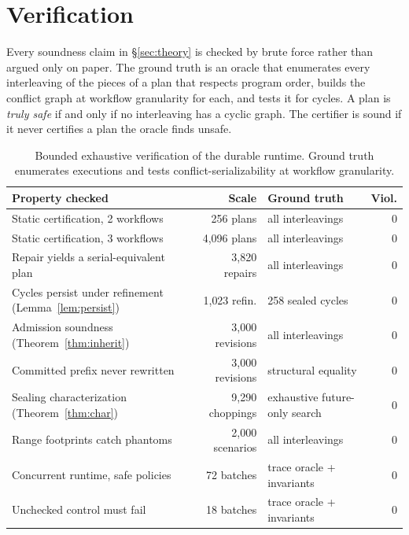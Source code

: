 \section{Verification}
\label{sec:verification}

Every soundness claim in \S\ref{sec:theory} is checked by brute force rather
than argued only on paper. The ground truth is an oracle that enumerates every
interleaving of the pieces of a plan that respects program order, builds the
conflict graph at workflow granularity for each, and tests it for cycles. A
plan is \emph{truly safe} if and only if no interleaving has a cyclic graph.
The certifier is sound if it never certifies a plan the oracle finds unsafe.

\begin{table}[t]
\caption{Bounded exhaustive verification of the durable runtime. Ground truth
enumerates executions and tests conflict-serializability at workflow
granularity.}
\label{tab:verify}
\small
\begin{tabular}{@{}p{3.55cm}rp{1.85cm}r@{}}
\toprule
Property checked & Scale & Ground truth & Viol. \\
\midrule
Static certification, 2 workflows & 256 plans & all interleavings & 0 \\
Static certification, 3 workflows & 4{,}096 plans & all interleavings & 0 \\
Repair yields a serial-equivalent plan & 3{,}820 repairs & all interleavings & 0 \\
Cycles persist under refinement (Lemma~\ref{lem:persist}) & 1{,}023 refin. & 258 sealed cycles & 0 \\
Admission soundness (Theorem~\ref{thm:inherit}) & 3{,}000 revisions & all interleavings & 0 \\
Committed prefix never rewritten & 3{,}000 revisions & structural equality & 0 \\
Sealing characterization (Theorem~\ref{thm:char}) & 9{,}290 choppings & exhaustive future-only search & 0 \\
Range footprints catch phantoms & 2{,}000 scenarios & all interleavings & 0 \\
Concurrent runtime, safe policies & 72 batches & trace oracle + invariants & 0 \\
Unchecked control must fail & 18 batches & trace oracle + invariants & 0 \\
\bottomrule
\end{tabular}
\end{table}

